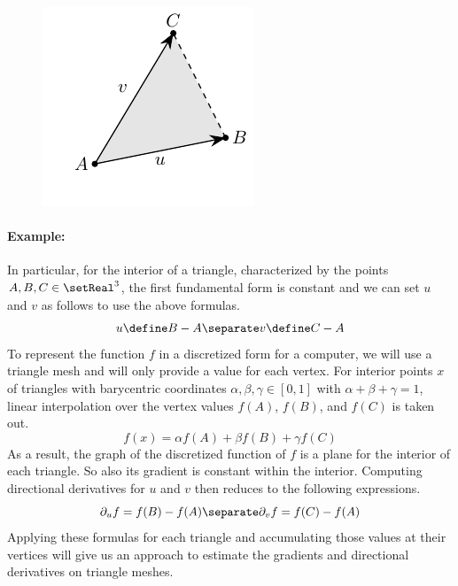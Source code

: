 \documentclass[9pt,fleqn,twoside,twocolumn]{stdglobal}
\begin{document}
  \begin{figure}[h]
    \centering
    \includegraphics[width=0.6\linewidth]{figures/triangle.pdf}
  \end{figure}

  \noindent
  \paragraph{Example:}
  In particular, for the interior of a triangle, characterized by the points $A,B,C\in\setReal^3$, the first fundamental form is constant and we can set $u$ and $v$ as follows to use the above formulas.
  \[
    u\define B-A
    \separate
    v\define C-A
  \]
  To represent the function $f$ in a discretized form for a computer, we will use a triangle mesh and will only provide a value for each vertex.
  For interior points $x$ of triangles with barycentric coordinates $α,β,γ\in[0,1]$ with $α+β+γ=1$, linear interpolation over the vertex values $f(A)$, $f(B)$, and $f(C)$ is taken out.
  \[
    f(x) = α f(A) + β f(B) + γ f(C)
  \]
  As a result, the graph of the discretized function of $f$ is a plane for the interior of each triangle.
  So also its gradient is constant within the interior.
  Computing directional derivatives for $u$ and $v$ then reduces to the following expressions.
  \[
    \partial_u f = f(B)-f(A)
    \separate
    \partial_v f = f(C)-f(A)
  \]
  Applying these formulas for each triangle and accumulating those values at their vertices will give us an approach to estimate the gradients and directional derivatives on triangle meshes.

\end{document}
